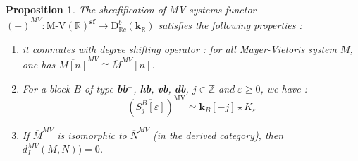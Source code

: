 \documentclass[a4paper, english, 11pt]{article}
\newcommand{\kk}[0]{\textbf{k}}
\newcommand{\0}{\vec{0}}
\newcommand{\R}[0]{\mathbb{R}}
\newcommand{\Z}[0]{\mathbb{Z}}
\newcommand{\D}[0]{\text{D}}
\newcommand{\MV}{\text{MV}}
\newcommand{\s}{\textbf{sf}}
\newtheorem{prop}{Proposition}[section]
\begin{document}
\begin{prop}\label{P:PropertiesofMVSheafification}
The sheafification of MV-systems functor $\overline{(-)}^{MV}: \text{M-V}(\R)^{\s} \to  \D^b_{\R c}(\kk_\R)$ satisfies the following properties : 
\begin{enumerate}
    \item it commutes with degree shifting operator : for all Mayer-Vietoris system $M$, one has $\overline{M[n]}^{MV} \cong \overline{M}^{MV}[n]$. 
    \item For  a block $B$ of type \textbf{bb$^-$}, \textbf{hb}, \textbf{vb}, \textbf{db}, $j\in \Z$ and $\varepsilon \geq 0$, we have : $$(\overline{S_j^B [\varepsilon]})^{\MV} \simeq \kk_B[-j] \star K_\varepsilon $$
    \item If $\overline{M}^{MV}$ is isomorphic to  $\overline{N}^{MV}$ (in the derived category), then $d_I^{MV}(M, N)) =0$.
 \end{enumerate}
\end{prop}
\end{document}
